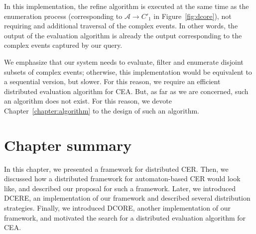 In this implementation, the refine algorithm is executed at the same time as the enumeration process (corresponding to $\mathcal{A} \to C'_{1}$ in Figure~\ref{fig:dcore}), not requiring and additional traversal of the complex events. In other words, the output of the evaluation algorithm is already the output corresponding to the complex events captured by our query.

We emphasize that our system needs to evaluate, filter and enumerate disjoint subsets of complex events; otherwise, this implementation would be equivalent to a sequential version, but slower. For this reason, we require an efficient distributed evaluation algorithm for CEA. But, as far as we are concerned, such an algorithm does not exist. For this reason, we devote Chapter~\ref{chapter:algorithm} to the design of such an algorithm.

\section{Chapter summary}

In this chapter, we presented a framework for distributed CER. Then, we discussed how a distributed framework for automaton-based CER would look like, and described our proposal for such a framework. Later, we introduced DCERE, an implementation of our framework and described several distribution strategies. Finally, we introduced DCORE, another implementation of our framework, and motivated the search for a distributed evaluation algorithm for CEA.
